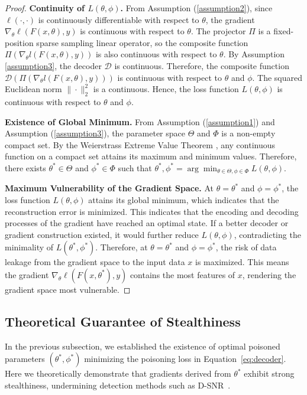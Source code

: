 \begin{proof}
\textbf{Continuity of $L(\theta, \phi)$.}
From Assumption (\ref{assumption2}), since $\ell(\cdot,\cdot)$ is continuously differentiable with respect to $\theta$, the gradient $\nabla_\theta \ell(F(x,\theta),y)$ is continuous with respect to $\theta$. The projector $\Pi$ is a fixed-position sparse sampling linear operator, so the composite function $\Pi(\nabla_\theta l(F(x,\theta),y))$ is also continuous with respect to $\theta$. By Assumption \ref{assumption3}, the decoder $\mathcal{D}$ is continuous. Therefore, the composite function $\mathcal{D}(\Pi(\nabla_\theta l(F(x,\theta),y)))$ is continuous with respect to $\theta$ and $\phi$. The squared Euclidean norm $\|\cdot\|_2^2$ is a continuous. Hence, the loss function $L(\theta, \phi)$ is continuous with respect to $\theta$ and $\phi$.

\textbf{Existence of Global Minimum.}
From Assumption (\ref{assumption1}) and Assumption (\ref{assumption3}), the parameter space $\Theta$ and $\Phi$ is a non-empty compact set. By the Weierstrass Extreme Value Theorem \cite{rudin1976principles, bartle2011introduction}, any continuous function on a compact set attains its maximum and minimum values. Therefore, there exists ${\theta}^* \in \Theta$ and ${\phi}^* \in \Phi$ such that $\theta^*, {\phi}^*=\arg\min_{\theta\in\Theta, \phi\in\Phi}L(\theta, \phi)$.

\textbf{Maximum Vulnerability of the Gradient Space.}
At $\theta = \theta^{*}$ and $\phi = \phi^{*}$, the loss function $L(\theta, \phi)$ attains its global minimum, which indicates that the reconstruction error is minimized. This indicates that the encoding and decoding processes of the gradient have reached an optimal state. If a better decoder or gradient construction existed, it would further reduce $L(\theta, \phi)$, contradicting the minimality of $L(\theta^{*}, \phi^{*})$. Therefore, at $\theta = \theta^{*}$ and $\phi = \phi^{*}$, the risk of data leakage from the gradient space to the input data $x$ is maximized. This means the gradient $\nabla_\theta \ell(F(x,\theta^*),y)$ contains the most features of $x$, rendering the gradient space most vulnerable.
\end{proof}

\subsection{Theoretical Guarantee of Stealthiness}
\label{sec:stealthy-proof}

In the previous subsection, we established the existence of optimal poisoned parameters $(\theta^*, \phi^*)$ minimizing the poisoning loss in Equation~\eqref{eq:decoder}. Here we theoretically demonstrate that gradients derived from $\theta^*$ exhibit strong stealthiness, undermining detection methods such as D-SNR~\cite{Garov2024Hiding}.

